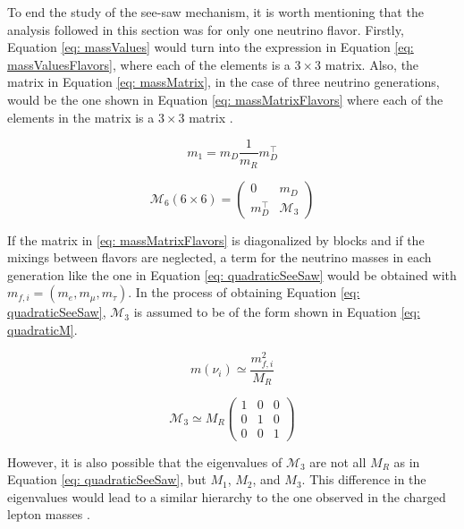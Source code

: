 To end the study of the see-saw mechanism, it is worth mentioning that the analysis followed in this section was for only one neutrino flavor. Firstly, Equation \ref{eq: massValues} would turn into the expression in Equation \ref{eq: massValuesFlavors}, where each of the elements is a $3 \times 3$ matrix. Also, the matrix in Equation \ref{eq: massMatrix}, in the case of three neutrino generations, would be the one shown in Equation \ref{eq: massMatrixFlavors} where each of the elements in the matrix is a $3 \times 3$ matrix \cite{NeutrinoMass}. 


\begin{equation}\label{eq: massValuesFlavors}
m_{1} = m_{D}\frac{1}{m_{R}}m_{D}^{\intercal}
\end{equation}

\begin{equation}\label{eq: massMatrixFlavors}
\mathcal{M}_{6}(6\times 6) = \begin{pmatrix} 0&m_{D}\\m_{D}^{\intercal}&\mathcal{M_{\text{3}}} \end{pmatrix}
\end{equation}

If the matrix in \ref{eq: massMatrixFlavors} is diagonalized by blocks and if the mixings between flavors are neglected, a term for the neutrino masses in each generation like the one in Equation \ref{eq: quadraticSeeSaw} would be obtained with $m_{f,i} = (m_{e}, m_{\mu}, m_{\tau})$. In the process of obtaining Equation \ref{eq: quadraticSeeSaw}, $\mathcal{M_{\text{3}}}$ is assumed to be of the form shown in Equation \ref{eq: quadraticM}. 

\begin{equation}\label{eq: quadraticSeeSaw}
m(\nu_{i}) \simeq \frac{m_{f,i}^2}{M_{R}}
\end{equation}

\begin{equation}\label{eq: quadraticM}
\mathcal{M_{\text{3}}} \simeq M_{R} \begin{pmatrix} 1 & 0 & 0\\0 & 1 & 0 \\ 0 & 0 & 1 \end{pmatrix}
\end{equation}

However, it is also possible that the eigenvalues of $\mathcal{M}_{3}$ are not all $M_{R}$ as in Equation \ref{eq: quadraticSeeSaw}, but $M_{1}$, $M_{2}$, and $M_{3}$. This difference in the eigenvalues would lead to a similar hierarchy to the one observed in the charged lepton masses \cite{NeutrinoMass}. 

